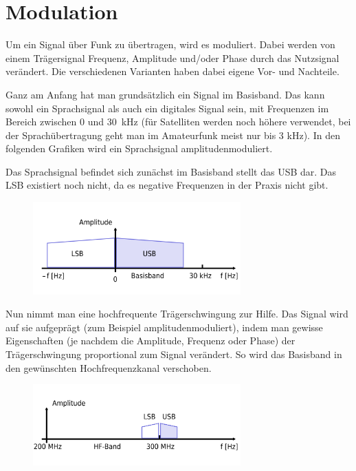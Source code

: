 \chapter{Modulation}\label{sec:modulation}
Um ein Signal über Funk zu übertragen, wird es moduliert. Dabei werden von einem Trägersignal Frequenz, Amplitude und/oder Phase durch das Nutzsignal verändert. Die verschiedenen Varianten haben dabei eigene Vor- und Nachteile.

Ganz am Anfang hat man grundsätzlich ein Signal im Basisband. Das kann sowohl ein Sprachsignal als auch ein digitales Signal sein, mit Frequenzen im Bereich zwischen 0 und 30 kHz (für Satelliten werden noch höhere verwendet, bei der Sprachübertragung geht man im Amateurfunk meist nur bis 3 kHz). In den folgenden Grafiken wird ein Sprachsignal amplitudenmoduliert.

Das Sprachsignal befindet sich zunächst im Basisband stellt das USB dar. Das LSB existiert noch nicht, da es negative Frequenzen in der Praxis nicht gibt.

\begin{figure}[h<!]
 \centering
 \includegraphics[width=8cm]{./png/Amfu-Modulation-Basisband.png}
 \label{fig:basisband}
\end{figure}


Nun nimmt man eine hochfrequente Trägerschwingung zur Hilfe. Das Signal wird auf sie aufgeprägt (zum Beispiel amplitudenmoduliert), indem man gewisse Eigenschaften (je nachdem die Amplitude, Frequenz oder Phase) der Trägerschwingung proportional zum Signal verändert. So wird das Basisband in den gewünschten Hochfrequenzkanal verschoben.

\begin{figure}[h!]
 \centering
 \includegraphics[width=8cm]{./png/Amfu-Modulation-HF.png}
 \label{fig:hfband}
\end{figure}


